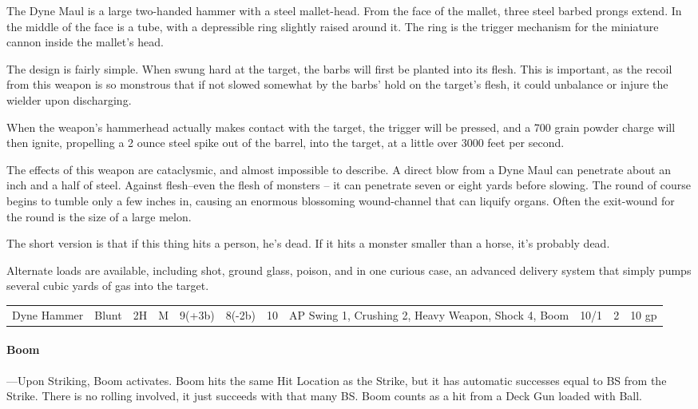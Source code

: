 \documentclass[oneside,11pt,english]{book}
\begin{document}
The Dyne Maul is a large two-handed hammer with a steel mallet-head. From the face of the 
mallet, three steel barbed prongs extend. In the middle of the face is a tube, with a depressible 
ring slightly raised around it. The ring is the trigger mechanism for the miniature cannon inside 
the mallet’s head. 

The design is fairly simple. When swung hard at the target, the barbs will first be planted into its 
flesh. This is important, as the recoil from this weapon is so monstrous that if not slowed 
somewhat by the barbs’ hold on the target’s flesh, it could unbalance or injure the wielder upon 
discharging. 

When the weapon’s hammerhead actually makes contact with the target, the trigger will be 
pressed, and a 700 grain powder charge will then ignite, propelling a 2 ounce steel spike out of 
the barrel, into the target, at a little over 3000 feet per second. 

The effects of this weapon are cataclysmic, and almost impossible to describe. A direct blow 
from a Dyne Maul can penetrate about an inch and a half of steel. Against flesh--even the flesh 
of monsters -- it can penetrate seven or eight yards
before slowing. The round of course begins 
to tumble only a few inches in, causing an enormous blossoming wound-channel that can liquify
organs. Often the exit-wound for the round is the size of a large melon. 

The short version is that if this thing hits a person, he’s dead. If it hits a monster smaller than a 
horse, it’s probably dead. 

Alternate loads are available, including shot, ground glass, poison, and in one curious case, an 
advanced delivery system that simply pumps several cubic yards of gas into the target. 

	\begin{tabu} to 
		Dyne Hammer & Blunt &2H & M & 9(+3b) & 8(-2b) & 10 & AP Swing 1, Crushing 2, Heavy Weapon, Shock 4, Boom & 10/1 & 2 & 10 gp\\
	\end{tabu}
\paragraph{Boom}
---\quad Upon Striking, Boom activates. Boom hits the same Hit Location as the Strike, but it has automatic successes equal to BS from the Strike. There is no rolling involved, it just succeeds with that many BS. Boom counts as a hit from a Deck Gun loaded with Ball.
\end{document}
